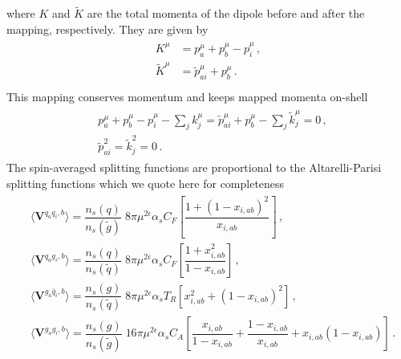 \documentclass[main.tex]{subfiles}
\begin{document}
        where $K$ and $\widetilde{K}$ are the total momenta
        of the dipole before and after the mapping, respectively. They are given by
        \begin{align}\label{eqn:II_mapping2}
            \begin{split}
            K^{\mu} &= p_{a}^{\mu} + p_{b}^{\mu} - p_{i}^{\mu} \, ,\\
            \widetilde{K}^{\mu} &= \tilde{p}_{ai}^{\mu} + p_{b}^{\mu} \, . \\
            \end{split}
        \end{align}
        This mapping conserves momentum and keeps mapped momenta on-shell
        \begin{align}\label{eqn:II_mapping_conditions}
            \begin{split}
            &p_{a}^{\mu} + p_{b}^{\mu} - p_{i}^{\mu} - \sum_{j} k_{j}^{\mu} = \tilde{p}_{ai}^{\mu} + p_{b}^{\mu} - \sum_{j} \tilde{k}_{j}^{\mu} = 0\, , \\
            &\tilde{p}_{ai}^{2} = \tilde{k}_{j}^{2} = 0 \, .
            \end{split}
        \end{align}
        The spin-averaged splitting functions are proportional
        to the Altarelli-Parisi splitting functions which we
        quote here for completeness
        \begin{align}\label{V_aib}
            \begin{split}
            &\langle \boldsymbol{V}^{q_{a}q_{i},b} \rangle = \dfrac{n_{s}(q)}{n_{s}(\tilde{g})} \; 8\pi \mu^{2\epsilon} \alpha_{s} C_{F} \left[\dfrac{1 + (1-x_{i,ab})^{2}}{x_{i,ab}}\right] \, , \\
            &\langle \boldsymbol{V}^{q_{a}g_{i},b} \rangle = \dfrac{n_{s}(q)}{n_{s}(\tilde{q})} \; 8\pi \mu^{2\epsilon} \alpha_{s} C_{F} \left[\dfrac{1 + x_{i,ab}^{2}}{1 - x_{i,ab}}\right] \, , \\
            &\langle \boldsymbol{V}^{g_{a}\bar{q}_{i},b} \rangle = \dfrac{n_{s}(g)}{n_{s}(\tilde{q})} \; 8\pi \mu^{2\epsilon} \alpha_{s} T_{R} \left[x_{i,ab}^{2} + (1-x_{i,ab})^{2}\right] \, , \\
            &\langle \boldsymbol{V}^{g_{a}g_{i},b} \rangle = \dfrac{n_{s}(g)}{n_{s}(\tilde{g})} \; 16\pi \mu^{2\epsilon} \alpha_{s} C_{A} \left[\dfrac{x_{i,ab}}{1-x_{i,ab}} + \dfrac{1-x_{i,ab}}{x_{i,ab}} + x_{i,ab}(1-x_{i,ab})\right] \, .
            \end{split}
        \end{align}
\end{document}
